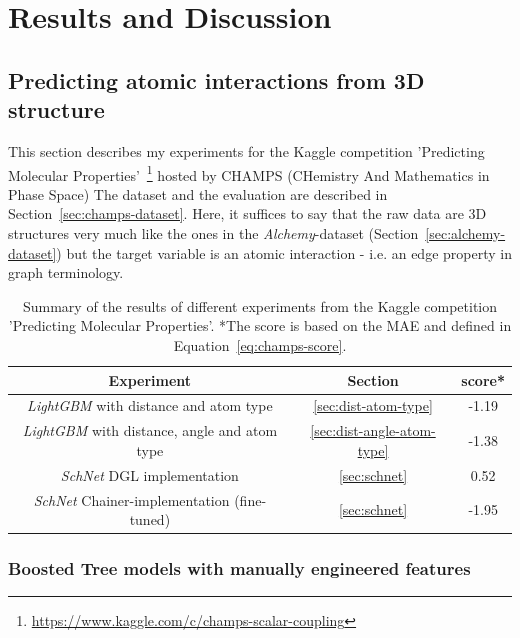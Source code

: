 \chapter{Results and Discussion}
\label{chapter:Results}

\section{Predicting atomic interactions from 3D structure}
\label{sec:champs}

This section describes my experiments for the Kaggle competition 'Predicting Molecular Properties'~\footnote{\url{https://www.kaggle.com/c/champs-scalar-coupling}} hosted by CHAMPS (CHemistry And Mathematics in Phase Space)
The dataset and the evaluation are described in Section~\ref{sec:champs-dataset}. Here, it suffices to say that the raw data are 3D structures very much like the ones in the \textit{Alchemy}-dataset (Section~\ref{sec:alchemy-dataset}) but the target variable is an atomic interaction - i.e. an edge property in graph terminology.


\begin{table}[H]
\begin{centering}
	\begin{tabular}{||c | c | c||} 
		\hline
		\textbf{Experiment} & \textbf{Section} & \textbf{score*} \\ [0.5ex] 
		\hline\hline
		\textit{LightGBM} with distance and atom type & \ref{sec:dist-atom-type} & -1.19 \\ 
		\textit{LightGBM} with distance, angle and atom type & \ref{sec:dist-angle-atom-type} & -1.38 \\
		\textit{SchNet} DGL implementation & \ref{sec:schnet} & 0.52  \\
		\textit{SchNet} Chainer-implementation (fine-tuned) & \ref{sec:schnet} & -1.95 \\ [1ex] 
		\hline
	\end{tabular}
	\vspace{0.5cm}
	\caption{Summary of the results of different experiments from the Kaggle competition 'Predicting Molecular Properties'. *The score is based on the MAE and defined in Equation~\ref{eq:champs-score}.}
	\label{tab:champs-results}
\end{centering}
\end{table}


\subsection{Boosted Tree models with manually engineered features}
\label{sec:champs-boosted-tree}

